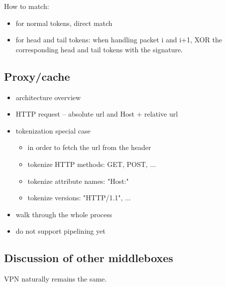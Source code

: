 How to match:
\begin{itemize}
\item for normal tokens, direct match
\item for head and tail tokens: when handling packet i and i+1, XOR the corresponding head and tail tokens with the signature.
\end{itemize}

\subsection{Proxy/cache}\label{sec:proxy}
\begin{itemize}
\item architecture overview
\item HTTP request -- absolute url and Host + relative url
\item tokenization special case \\
    \begin{itemize}
    \item in order to fetch the url from the header
    \item tokenize HTTP methods: GET, POST, ...
    \item tokenize attribute names: "Host:"
    \item tokenize versions: "HTTP/1.1", ...
    \end{itemize}
\item walk through the whole process
\item do not support pipelining yet
\end{itemize}

\subsection{Discussion of other middleboxes}\label{sec:vpn} \label{sec:other} \label{sec:not_supp}

VPN naturally remains the same. 